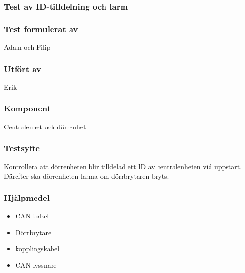 \clearpage
\subsubsection{Test av ID-tilldelning och larm}
\label{test:idLarm}

\setlength{\columnsep}{1cm}




\begin{multicols}{2}
\subsubsection*{Test formulerat av}
Adam och Filip

\subsubsection*{Utfört av}
Erik


\end{multicols}
\subsubsection*{Komponent}
Centralenhet och dörrenhet



\subsubsection*{Testsyfte}
Kontrollera att dörrenheten blir tilldelad ett ID av centralenheten vid uppstart. Därefter ska dörrenheten larma om dörrbrytaren bryts.


\subsubsection*{Hjälpmedel}
\begin{itemize}
	\item CAN-kabel
	\item Dörrbrytare
	\item kopplingskabel
	\item CAN-lyssnare
\end{itemize}



